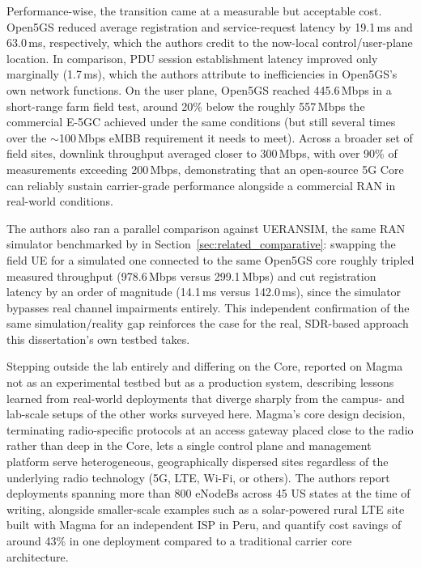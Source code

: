 Performance-wise, the transition came at a measurable but acceptable cost. Open5GS reduced average registration and service-request latency by 19.1\,ms and 63.0\,ms, respectively, which the authors credit to the now-local control/user-plane location. In comparison, \gls{PDU} session establishment latency improved only marginally (1.7\,ms), which the authors attribute to inefficiencies in Open5GS's own network functions. On the user plane, Open5GS reached 445.6\,Mbps in a short-range farm field test, around 20\% below the roughly 557\,Mbps the commercial E-5GC achieved under the same conditions (but still several times over the $\sim$100\,Mbps \gls{eMBB} requirement it needs to meet). Across a broader set of field sites, downlink throughput averaged closer to 300\,Mbps, with over 90\% of measurements exceeding 200\,Mbps, demonstrating that an open-source 5G Core can reliably sustain carrier-grade performance alongside a commercial \gls{RAN} in real-world conditions.

The authors also ran a parallel comparison against UERANSIM, the same \gls{RAN} simulator benchmarked by \textcite{rouili2024evaluating} in Section~\ref{sec:related_comparative}: swapping the field \gls{UE} for a simulated one connected to the same Open5GS core roughly tripled measured throughput (978.6\,Mbps versus 299.1\,Mbps) and cut registration latency by an order of magnitude (14.1\,ms versus 142.0\,ms), since the simulator bypasses real channel impairments entirely. This independent confirmation of the same simulation/reality gap reinforces the case for the real, \gls{SDR}-based approach this dissertation's own testbed takes.

Stepping outside the lab entirely and differing on the Core, \textcite{hasan2023building} reported on Magma not as an experimental testbed but as a production system, describing lessons learned from real-world deployments that diverge sharply from the campus- and lab-scale setups of the other works surveyed here. Magma's core design decision, terminating radio-specific protocols at an access gateway placed close to the radio rather than deep in the Core, lets a single control plane and management platform serve heterogeneous, geographically dispersed sites regardless of the underlying radio technology (5G, \gls{LTE}, Wi-Fi, or others). The authors report deployments spanning more than 800 eNodeBs across 45 US states at the time of writing, alongside smaller-scale examples such as a solar-powered rural \gls{LTE} site built with Magma for an independent ISP in Peru, and quantify cost savings of around 43\% in one deployment compared to a traditional carrier core architecture.

